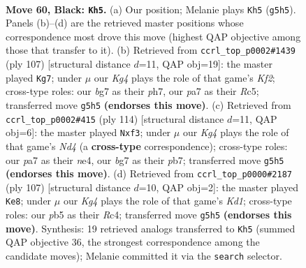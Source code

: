 \documentclass[11pt]{article}
\begin{document}
\clearpage

\begin{figure}[p]\centering
\begin{subfigure}{0.46\textwidth}\centering
\resizebox{\linewidth}{!}{%
\newchessgame
\chessboard[
  setfen={8/P5B1/5R2/1P4k1/3K4/8/8/8 b - - 2 60},
  showmover=false,
  pgfstyle=straightmove, color=movearrow, markmove={g5-h5}
]}
\caption{}
\end{subfigure}\hfill
\begin{subfigure}{0.46\textwidth}\centering
\resizebox{\linewidth}{!}{%
\newchessgame
\chessboard[
  setfen={8/5k1P/4R3/2r5/5P1K/8/8/8 b - - 0 54},
  showmover=false,
  pgfstyle=straightmove, color=movearrow, markmove={f7-g7}
]}
\caption{}
\end{subfigure}
\\[4pt]
\begin{subfigure}{0.46\textwidth}\centering
\resizebox{\linewidth}{!}{%
\newchessgame
\chessboard[
  setfen={8/1p6/6k1/8/3Nn3/5r2/7K/8 w - - 0 58},
  showmover=false,
  pgfstyle=straightmove, color=movearrow, markmove={d4-f3}
]}
\caption{}
\end{subfigure}\hfill
\begin{subfigure}{0.46\textwidth}\centering
\resizebox{\linewidth}{!}{%
\newchessgame
\chessboard[
  setfen={3k4/3R4/p7/5B2/2r5/4K3/8/8 b - - 2 54},
  showmover=false,
  pgfstyle=straightmove, color=movearrow, markmove={d8-e8}
]}
\caption{}
\end{subfigure}
\caption{\textbf{Move 60, Black: \texttt{Kh5}.} (a) Our position; Melanie plays \texttt{Kh5} (\texttt{g5h5}). Panels (b)--(d) are the retrieved master positions whose correspondence most drove this move (highest QAP objective among those that transfer to it). (b) Retrieved from \texttt{ccrl\_top\_p0002\#1439} (ply 107) [structural distance $d$=11, QAP obj=19]: the master played \texttt{Kg7}; under $\mu$ our \emph{Kg4} plays the role of that game's \emph{Kf2}; cross-type roles: our \emph{b}g7 as their \emph{p}h7, our \emph{p}a7 as their \emph{R}c5; transferred move \texttt{g5h5} \textbf{(endorses this move)}. (c) Retrieved from \texttt{ccrl\_top\_p0002\#415} (ply 114) [structural distance $d$=11, QAP obj=6]: the master played \texttt{Nxf3}; under $\mu$ our \emph{Kg4} plays the role of that game's \emph{Nd4} (a \textbf{cross-type} correspondence); cross-type roles: our \emph{p}a7 as their \emph{n}e4, our \emph{b}g7 as their \emph{p}b7; transferred move \texttt{g5h5} \textbf{(endorses this move)}. (d) Retrieved from \texttt{ccrl\_top\_p0000\#2187} (ply 107) [structural distance $d$=10, QAP obj=2]: the master played \texttt{Ke8}; under $\mu$ our \emph{Kg4} plays the role of that game's \emph{Kd1}; cross-type roles: our \emph{p}b5 as their \emph{R}c4; transferred move \texttt{g5h5} \textbf{(endorses this move)}. Synthesis: 19 retrieved analogs transferred to \texttt{Kh5} (summed QAP objective 36, the strongest correspondence among the candidate moves); Melanie committed it via the \texttt{search} selector.}
\label{fig:thought-m119}
\end{figure}
\end{document}

